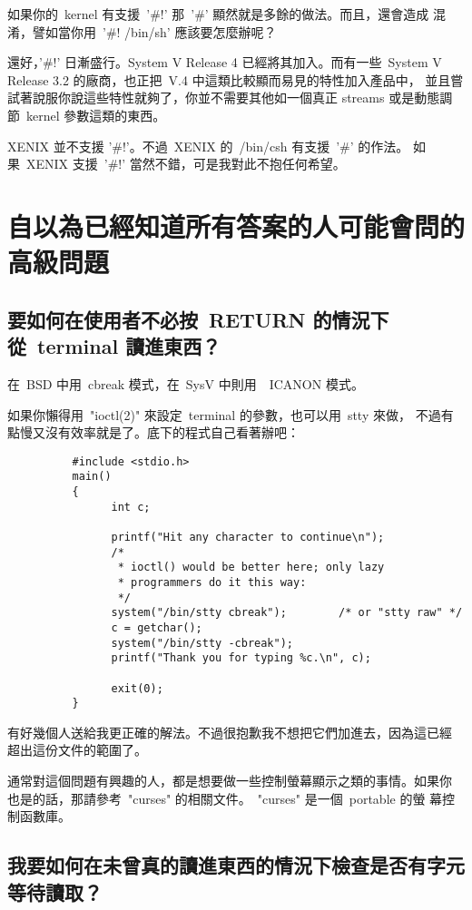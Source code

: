\documentclass{article}
\begin{document}
\begin{CJK*}{Bg5}{ming}
	如果你的~kernel 有支援~'\#!' 那~'\#' 顯然就是多餘的做法。而且，還會造成
	混淆，譬如當你用~'\#! /bin/sh' 應該要怎麼辦呢？

	還好，'\#!' 日漸盛行。System V Release 4 已經將其加入。而有一些~System 
	V Release 3.2 的廠商，也正把~V.4 中這類比較顯而易見的特性加入產品中，
	並且嘗試著說服你說這些特性就夠了，你並不需要其他如一個真正 streams 
	或是動態調節~kernel 參數這類的東西。

	XENIX 並不支援 '\#!'。不過~XENIX 的~/bin/csh 有支援~'\#' 的作法。 如
	果~XENIX 支援~'\#!' 當然不錯，可是我對此不抱任何希望。


\section{自以為已經知道所有答案的人可能會問的高級問題}
\subsection{要如何在使用者不必按~RETURN 的情況下從~terminal 讀進東西？}

	在~BSD 中用~cbreak 模式，在~SysV 中則用~~ICANON 模式。

	如果你懶得用~"ioctl(2)" 來設定~terminal 的參數，也可以用~stty 來做，
        不過有點慢又沒有效率就是了。底下的程式自己看著辦吧：
\small
\begin{verbatim}
	      #include <stdio.h>
	      main()
	      {
        	    int c;

	            printf("Hit any character to continue\n");
        	    /*
	             * ioctl() would be better here; only lazy
        	     * programmers do it this way:
	             */
        	    system("/bin/stty cbreak");        /* or "stty raw" */
	            c = getchar();
	            system("/bin/stty -cbreak");
	            printf("Thank you for typing %c.\n", c);

	            exit(0);
	      }
\end{verbatim}
\normalsize
	有好幾個人送給我更正確的解法。不過很抱歉我不想把它們加進去，因為這已經
	超出這份文件的範圍了。

	通常對這個問題有興趣的人，都是想要做一些控制螢幕顯示之類的事情。如果你
	也是的話，那請參考~"curses" 的相關文件。~"curses" 是一個~portable 的螢
        幕控制函數庫。

\subsection{我要如何在未曾真的讀進東西的情況下檢查是否有字元等待讀取？}


\end{CJK*}
\end{document}
